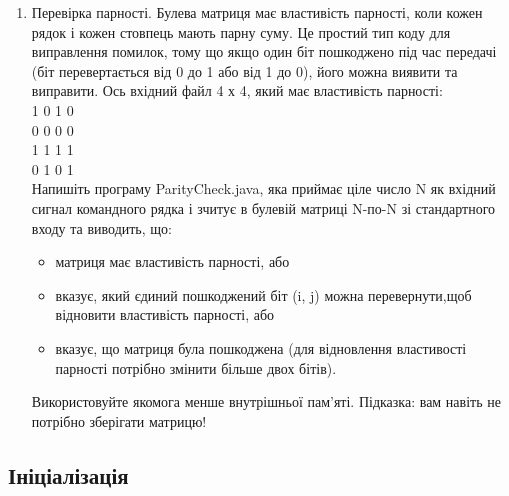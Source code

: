 \documentclass[]{article}
\begin{document}
\begin{enumerate}
\item Перевірка парності.
Булева матриця має властивість парності, коли кожен рядок і кожен стовпець мають парну суму.
Це простий тип коду для виправлення помилок, тому що якщо один біт пошкоджено під час передачі
 (біт перевертається від 0 до 1 або від 1 до 0), його можна виявити та виправити. Ось вхідний файл 4 х 4, який має властивість парності:\\
1 0 1 0 \\
0 0 0 0 \\
1 1 1 1 \\
0 1 0 1 \\
Напишіть програму ParityCheck.java, яка приймає ціле число N як вхідний сигнал командного рядка і зчитує в булевій матриці N-по-N зі стандартного входу
та виводить, що:
\begin{itemize}
\item матриця має властивість парності, або 
\item вказує, який єдиний пошкоджений біт (i, j) можна перевернути,щоб відновити властивість парності, або 
\item вказує, що матриця була пошкоджена 
(для відновлення властивості парності потрібно змінити більше двох бітів).
\end{itemize}
 Використовуйте якомога менше внутрішньої пам’яті. Підказка: вам навіть не потрібно зберігати матрицю!


\end{enumerate}

  \subsection{Ініціалізація}
\end{document}
